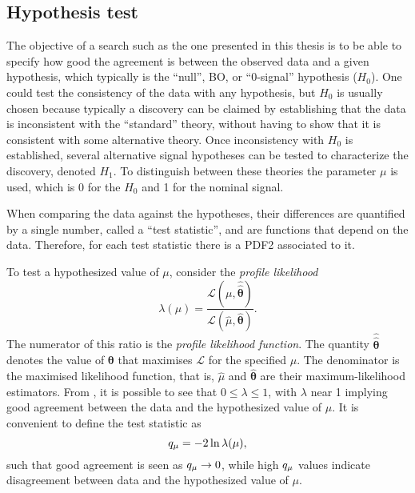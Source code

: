 \subsection{Hypothesis test}
\label{subsec:strategy:stat_treatment:hypo_test}

The objective of a search such as the one presented in this thesis is to be able to specify how good the agreement is between the observed data and a given hypothesis, which typically is the \enquote{null}, \ac{BO}, or \enquote{0-signal} hypothesis (\(H_0\)). One could test the consistency of the data with any hypothesis, but \(H_0\) is usually chosen because typically a discovery can be claimed by establishing that the data is inconsistent with the \enquote{standard} theory, without having to show that it is consistent with some alternative theory. Once inconsistency with \(H_0\) is established, several alternative signal hypotheses can be tested to characterize the discovery, denoted \(H_1\). To distinguish between these theories the parameter \(\mu\) is used, which is 0 for the \(H_0\) and 1 for the nominal signal.

When comparing the data against the hypotheses, their differences are quantified by a single number, called a \enquote{test statistic}, and are functions that depend on the data. Therefore, for each test statistic there is a \ac{PDF2} associated to it.

To test a hypothesized value of \(\mu\), consider the \textit{profile likelihood}
\begin{equation}
    \label{eq:strategy:stat_treatment:hypo_test:lambdamu}
    \lambda(\mu) = \frac{
        \mathcal{L} \left(\mu, \hat{\hat{\bm{\theta}}}\right)
    }{
        \mathcal{L} \left(\hat{\mu}, \hat{\bm{\theta}}\right)
    }.
\end{equation}
The numerator of this ratio is the \textit{profile likelihood function}. The quantity \(\hat{\hat{\bm{\theta}}}\) denotes the value of \(\bm{\theta}\) that maximises \(\mathcal{L}\) for the specified \(\mu\). The denominator is the maximised likelihood function, that is, \(\hat{\mu}\) and \(\hat{\bm{\theta}}\) are their maximum-likelihood estimators. 
From \Eqn{\ref{eq:strategy:stat_treatment:hypo_test:lambdamu}}, it is possible to see that \(0 \leq \lambda \leq 1\), with \(\lambda\) near 1 implying good agreement between the data and the hypothesized value of \(\mu\).
It is convenient to define the test statistic \qmu as
\begin{equation}
    \label{eq:strategy:stat_treatment:hypo_test:qmu}
    q_{\mu}  = - 2 \ln \lambda(\mu),
\end{equation}
such that good agreement is seen as \(q_{\mu} \rightarrow 0\), while high \(q_{\mu}\) values indicate disagreement between data and the hypothesized value of \(\mu\).


